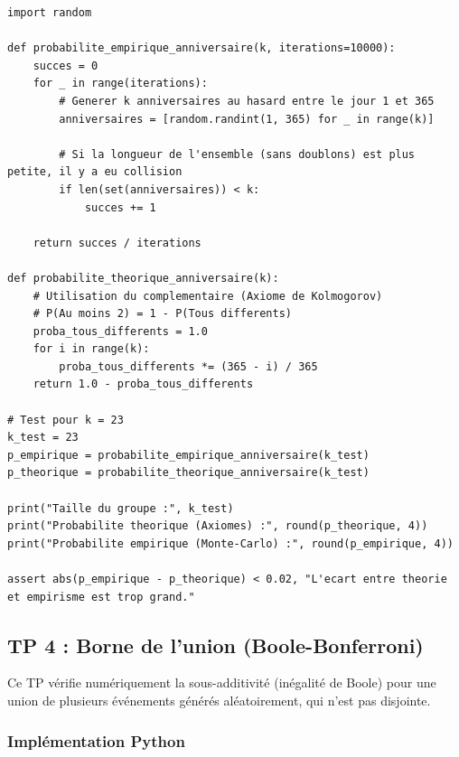 \documentclass[11pt,a4paper]{article}
\begin{document}
\begin{lstlisting}
import random

def probabilite_empirique_anniversaire(k, iterations=10000):
    succes = 0
    for _ in range(iterations):
        # Generer k anniversaires au hasard entre le jour 1 et 365
        anniversaires = [random.randint(1, 365) for _ in range(k)]

        # Si la longueur de l'ensemble (sans doublons) est plus petite, il y a eu collision
        if len(set(anniversaires)) < k:
            succes += 1

    return succes / iterations

def probabilite_theorique_anniversaire(k):
    # Utilisation du complementaire (Axiome de Kolmogorov)
    # P(Au moins 2) = 1 - P(Tous differents)
    proba_tous_differents = 1.0
    for i in range(k):
        proba_tous_differents *= (365 - i) / 365
    return 1.0 - proba_tous_differents

# Test pour k = 23
k_test = 23
p_empirique = probabilite_empirique_anniversaire(k_test)
p_theorique = probabilite_theorique_anniversaire(k_test)

print("Taille du groupe :", k_test)
print("Probabilite theorique (Axiomes) :", round(p_theorique, 4))
print("Probabilite empirique (Monte-Carlo) :", round(p_empirique, 4))

assert abs(p_empirique - p_theorique) < 0.02, "L'ecart entre theorie et empirisme est trop grand."
\end{lstlisting}



\subsection*{TP 4 : Borne de l'union (Boole-Bonferroni)}

Ce TP vérifie numériquement la sous-additivité (inégalité de Boole) pour une union de plusieurs événements générés aléatoirement, qui n'est pas disjointe.

\subsubsection*{Implémentation Python}
\end{document}
